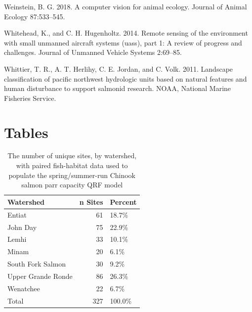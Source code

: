 \documentclass[
  12pt,
]{article}
\begin{document}
\leavevmode\hypertarget{ref-Weinstein2018}{}%
Weinstein, B. G. 2018. A computer vision for animal ecology. Journal of Animal Ecology 87:533--545.

\leavevmode\hypertarget{ref-Whitehead2014}{}%
Whitehead, K., and C. H. Hugenholtz. 2014. Remote sensing of the environment with small unmanned aircraft systems (uass), part 1: A review of progress and challenges. Journal of Unmanned Vehicle Systems 2:69--85.

\leavevmode\hypertarget{ref-Whittier2011}{}%
Whittier, T. R., A. T. Herlihy, C. E. Jordan, and C. Volk. 2011. Landscape classification of pacific northwest hydrologic units based on natural features and human disturbance to support salmonid research. NOAA, National Marine Fisheries Service.

\newpage

\hypertarget{tables}{%
\section{Tables}\label{tables}}

\hypertarget{tables}{}

\begin{table}[!h]

\caption{\label{tab:fish-hab-sites}The number of unique sites, by watershed, with paired fish-habitat data used to populate the spring/summer-run Chinook salmon parr capacity QRF model}
\centering
\fontsize{10}{12}\selectfont
\begin{tabular}[t]{lrl}
\toprule
Watershed & n Sites & Percent\\
\midrule
Entiat & 61 & 18.7\%\\
John Day & 75 & 22.9\%\\
Lemhi & 33 & 10.1\%\\
Minam & 20 & 6.1\%\\
South Fork Salmon & 30 & 9.2\%\\
Upper Grande Ronde & 86 & 26.3\%\\
Wenatchee & 22 & 6.7\%\\
Total & 327 & 100.0\%\\
\bottomrule
\end{tabular}
\end{table}

\newpage
\end{document}
